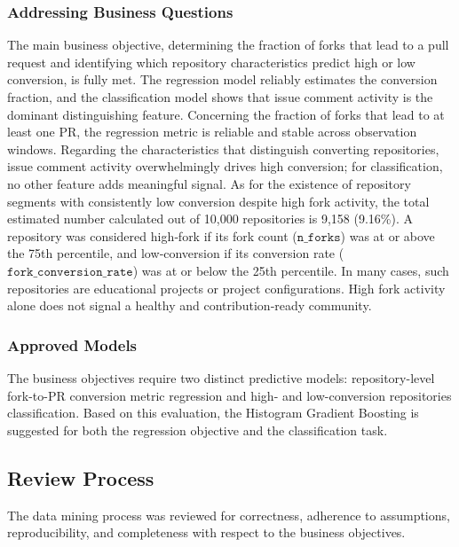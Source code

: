 \subsubsection{Addressing Business Questions}
The main business objective, determining the fraction of forks that lead to a pull request and identifying which repository characteristics predict high or low conversion, is fully met. The regression model reliably estimates the conversion fraction, and the classification model shows that issue comment activity is the dominant distinguishing feature. Concerning the fraction of forks that lead to at least one PR, the regression metric is reliable and stable across observation windows.  
Regarding the characteristics that distinguish converting repositories, issue comment activity overwhelmingly drives high conversion; for classification, no other feature adds meaningful signal.
As for the existence of repository segments with consistently low conversion despite high fork activity, the total estimated number calculated out of 10,000 repositories is 9,158 (9.16\%). A repository was considered high‑fork if its fork count ($\texttt{n\_forks}$) was at or above the 75th percentile, and low‑conversion if its conversion rate ($\texttt{fork\_conversion\_rate}$) was at or below the 25th percentile. In many cases, such repositories are educational projects or project configurations. High fork activity alone does not signal a healthy and contribution‑ready community.

\subsubsection{Approved Models}
The business objectives require two distinct predictive models: repository-level fork-to-PR conversion metric regression and high- and low-conversion repositories classification. Based on this evaluation, the Histogram Gradient Boosting is suggested for both the regression objective and the classification task.

\subsection{Review Process}

The data mining process was reviewed for correctness, adherence to assumptions, reproducibility, and completeness with respect to the business objectives.

